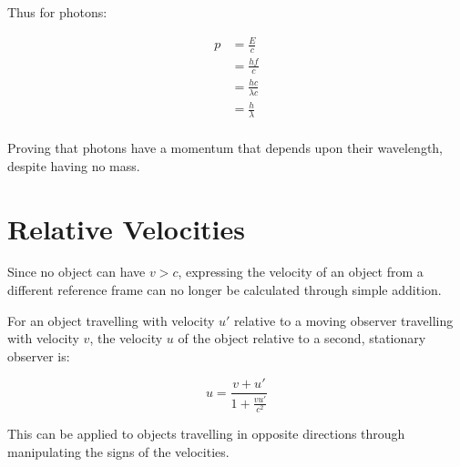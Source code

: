 \documentclass[a4paper,11pt]{report}
\begin{document}
Thus for photons:

$$
\begin{aligned}
p & = \frac{E}{c} \\
& = \frac{hf}{c} \\
& = \frac{hc}{\lambda c} \\
& = \frac{h}{\lambda} \\
\end{aligned}
$$

Proving that photons have a momentum that depends upon their wavelength,
despite having no mass.


\section{Relative Velocities}

Since no object can have $v > c$, expressing the velocity of an object from a
different reference frame can no longer be calculated through simple addition.

For an object travelling with velocity $u'$ relative to a moving observer
travelling with velocity $v$, the velocity $u$ of the object relative to a
second, stationary observer is:

$$
u = \frac{v + u'}{1 + \frac{vu'}{c^2}}
$$

This can be applied to objects travelling in opposite directions through
manipulating the signs of the velocities.
\end{document}
